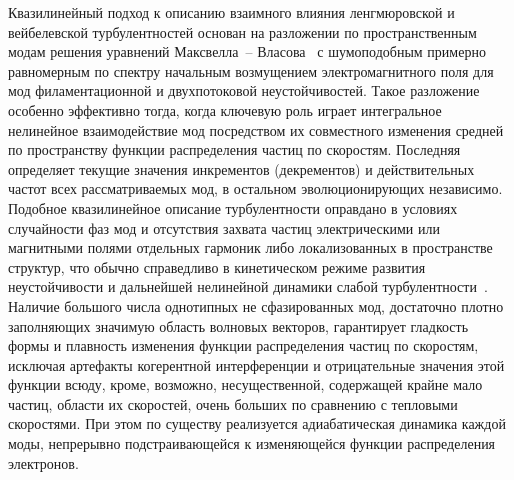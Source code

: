 Квазилинейный подход к описанию взаимного влияния ленгмюровской и вейбелевской турбулентностей основан на разложении по пространственным модам решения уравнений  Максвелла~-- Власова~\cite{Baumjohann2012} с шумоподобным примерно равномерным по спектру начальным возмущением электромагнитного поля для мод филаментационной и двухпотоковой неустойчивостей. Такое разложение особенно эффективно тогда, когда ключевую роль играет интегральное нелинейное взаимодействие мод посредством их совместного изменения средней по пространству функции распределения частиц по скоростям. Последняя определяет текущие значения инкрементов (декрементов) и действительных частот всех рассматриваемых мод, в остальном эволюционирующих независимо. 
Подобное квазилинейное описание турбулентности оправдано в условиях случайности фаз мод и отсутствия захвата частиц электрическими или магнитными полями отдельных гармоник либо локализованных в пространстве структур, что обычно справедливо в кинетическом режиме развития неустойчивости и дальнейшей нелинейной динамики слабой турбулентности~\cite{GaleevSagdeev1969,Bakunin2017,Kuznetsov2023}. Наличие большого числа однотипных не сфазированных мод, достаточно плотно заполняющих значимую область волновых векторов, гарантирует гладкость формы и плавность изменения функции распределения частиц по скоростям, исключая артефакты когерентной интерференции и отрицательные значения этой функции всюду, кроме, возможно, несущественной, содержащей крайне мало частиц, области их скоростей, очень больших по сравнению с тепловыми скоростями. При этом по существу реализуется адиабатическая динамика каждой моды, непрерывно подстраивающейся к изменяющейся функции распределения электронов. 

